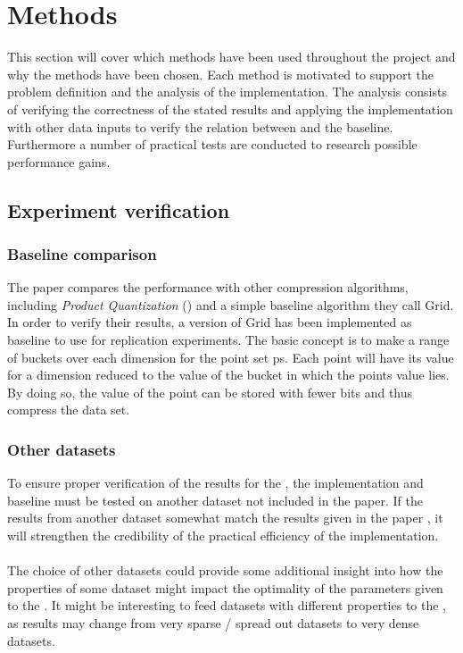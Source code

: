 \section{Methods}
\label{methods}
This section will cover which methods have been used throughout the project and why the methods have been chosen. Each method is motivated to support the problem definition and the analysis of the \qs{} implementation. The analysis consists of verifying the correctness of the stated results and applying the implementation with other data inputs to verify the relation between \qs{} and the baseline. Furthermore a number of practical tests are conducted to research possible performance gains.

\subsection{Experiment verification}

\subsubsection{Baseline comparison}
The paper compares the \qs{} performance with other compression algorithms, including \textit{Product Quantization} (\pq{}) and a simple baseline algorithm they call Grid. In order to verify their results, a version of Grid has been implemented as baseline to use for replication experiments. The basic concept is to make a range of buckets over each dimension for the point set ps. Each point will have its value for a dimension reduced to the value of the bucket in which the points value lies. By doing so, the value of the point can be stored with fewer bits and thus compress the data set.

\subsubsection{Other datasets}
To ensure proper verification of the results for the \qs{}, the implementation and baseline must be tested on another dataset not included in the paper. If the results from another dataset somewhat match the results given in the paper \cite{wagner17}, it will strengthen the credibility of the practical efficiency of the \qs{} implementation.
\\
\\
The choice of other datasets could provide some additional insight into how the properties of some dataset might impact the optimality of the parameters given to the \qs{}. It might be interesting to feed datasets with different properties to the \qs{}, as results may change from very sparse / spread out datasets to very dense datasets.

